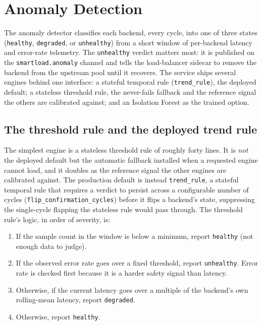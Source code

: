 \section{Anomaly Detection}\label{imb:anomaly}

The anomaly detector classifies each backend, every cycle, into one of three
states (\texttt{healthy}, \texttt{degraded}, or \texttt{unhealthy}) from a short
window of per-backend latency and error-rate telemetry. The \texttt{unhealthy}
verdict matters most: it is published on the \texttt{smartload.anomaly} channel
and tells the load-balancer sidecar to remove the backend from the upstream pool
until it recovers. The service ships several engines behind one interface: a
stateful temporal rule (\texttt{trend\_rule}), the deployed default; a stateless
threshold rule, the never-fails fallback and the reference signal the others are
calibrated against; and an Isolation Forest as the trained option.

\subsection{The threshold rule and the deployed trend rule}\label{imb:threshold}

The simplest engine is a stateless threshold rule of roughly forty lines. It is
\emph{not} the deployed default but the automatic fallback installed when a
requested engine cannot load, and it doubles as the reference signal the other
engines are calibrated against. The production default is instead
\texttt{trend\_rule}, a stateful temporal rule that requires a verdict to persist
across a configurable number of cycles (\texttt{flip\_confirmation\_cycles})
before it flips a backend's state, suppressing the single-cycle flapping the
stateless rule would pass through. The threshold rule's logic, in order of
severity, is:

\begin{enumerate}
  \item If the sample count in the window is below a minimum, report
        \texttt{healthy} (not enough data to judge).
  \item If the observed error rate goes over a fixed threshold, report
        \texttt{unhealthy}. Error rate is checked first because it is a harder
        safety signal than latency.
  \item Otherwise, if the current latency goes over a multiple of the backend's
        own rolling-mean latency, report \texttt{degraded}.
  \item Otherwise, report \texttt{healthy}.
\end{enumerate}

